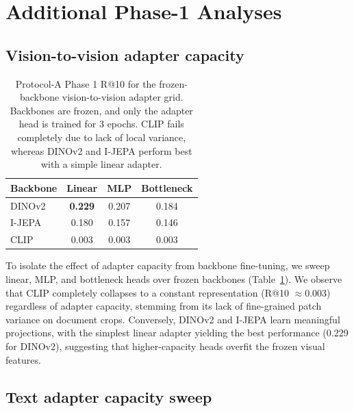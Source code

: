 \documentclass{article}
\begin{document}



\clearpage
\appendix
\section{Additional Phase-1 Analyses}
\label{sec:appendix}

\subsection{Vision-to-vision adapter capacity}
\label{sec:adapter_vv}

\begin{table}[t]
\caption{Protocol-A Phase 1 R@10 for the frozen-backbone vision-to-vision adapter grid. Backbones are frozen, and only the adapter head is trained for 3 epochs. CLIP fails completely due to lack of local variance, whereas DINOv2 and I-JEPA perform best with a simple linear adapter.}
\label{tab:adapter_vv}
\centering
\small
\begin{tabular}{lccc}
\toprule
Backbone & Linear & MLP & Bottleneck \\
\midrule
\rowcolor{cSSL} DINOv2 & \textbf{0.229} & 0.207 & 0.184 \\
\rowcolor{cSSL} I-JEPA & 0.180 & 0.157 & 0.146 \\
\rowcolor{cITC} CLIP   & 0.003 & 0.003 & 0.003 \\
\bottomrule
\end{tabular}
\end{table}

To isolate the effect of adapter capacity from backbone fine-tuning, we sweep linear, MLP, and bottleneck heads over frozen backbones (Table~\ref{tab:adapter_vv}). We observe that CLIP completely collapses to a constant representation (R@10 $\approx 0.003$) regardless of adapter capacity, stemming from its lack of fine-grained patch variance on document crops. Conversely, DINOv2 and I-JEPA learn meaningful projections, with the simplest linear adapter yielding the best performance (0.229 for DINOv2), suggesting that higher-capacity heads overfit the frozen visual features.

\subsection{Text adapter capacity sweep}
\label{sec:adapter}
\end{document}
